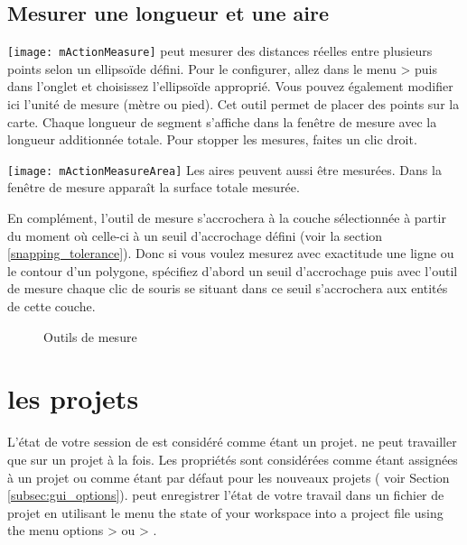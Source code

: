 \subsection{Mesurer une longueur et une aire}
\texttt{[image: mActionMeasure]} 
\qg peut mesurer des distances réelles entre plusieurs points selon un ellipsoïde défini. Pour le configurer, allez dans le menu  > puis dans l'onglet  et choisissez l'ellipsoïde approprié. Vous pouvez également modifier ici l'unité de mesure (mètre ou pied). Cet outil permet de placer des points sur la carte. Chaque longueur de segment s'affiche dans la fenêtre de mesure avec la longueur additionnée totale. Pour stopper les mesures, faites un clic droit. \par
\texttt{[image: mActionMeasureArea]} Les aires peuvent aussi être mesurées.
Dans la fenêtre de mesure apparaît la surface totale mesurée. \par
En complément, l'outil de mesure s'accrochera à la couche sélectionnée à partir du moment où celle-ci à un seuil d'accrochage défini (voir la section \ref{snapping_tolerance}). Donc si vous voulez mesurez avec exactitude une ligne ou le contour d'un polygone, spécifiez d'abord un seuil d'accrochage puis avec l'outil de mesure chaque clic de souris se situant dans ce seuil s'accrochera aux entités de cette couche.

\begin{figure}[ht]
\centering
  \hspace{1cm}
  \caption{Outils de mesure \nixcaption} \label{fig:measure}
\end{figure}

\section{les projets}\label{sec:projects}

L'état de votre session de \qg est considéré comme étant un projet. \qg ne peut travailler que sur un projet à la fois. Les propriétés sont considérées comme étant assignées à un projet ou comme étant par défaut pour les nouveaux projets ( voir Section \ref{subsec:gui_options}). \qg peut enregistrer l'état de votre travail dans un fichier de projet en utilisant le menu the state of your 
workspace into a project file using the menu options 
 > 
ou  > .

